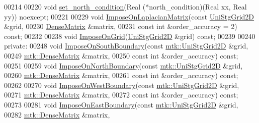 \begin{DoxyCode}
00214 
00220   \textcolor{keywordtype}{void} \hyperlink{classmtk_1_1BCDescriptor2D_a690f6881a88b202c074d9f90f2a7ddb0}{set\_north\_condition}(Real (*north\_condition)(Real xx, Real yy)) noexcept;
00221 
00229   \textcolor{keywordtype}{void} \hyperlink{classmtk_1_1BCDescriptor2D_a35592617dda3b965b680b2a1355122f4}{ImposeOnLaplacianMatrix}(\textcolor{keyword}{const} \hyperlink{classmtk_1_1UniStgGrid2D}{UniStgGrid2D} &grid,
00230                                \hyperlink{classmtk_1_1DenseMatrix}{DenseMatrix} &matrix,
00231                                \textcolor{keyword}{const} \textcolor{keywordtype}{int} &order\_accuracy = 2) \textcolor{keyword}{const};
00232 
00238   \textcolor{keywordtype}{void} \hyperlink{classmtk_1_1BCDescriptor2D_a5f0ff1fda1b5266dcd77ba2301c8ba2c}{ImposeOnGrid}(\hyperlink{classmtk_1_1UniStgGrid2D}{UniStgGrid2D} &grid) \textcolor{keyword}{const};
00239 
00240 \textcolor{keyword}{private}:
00248   \textcolor{keywordtype}{void} \hyperlink{classmtk_1_1BCDescriptor2D_acba15639218e80fd93aff482b185201e}{ImposeOnSouthBoundary}(\textcolor{keyword}{const} \hyperlink{classmtk_1_1UniStgGrid2D}{mtk::UniStgGrid2D} &grid,
00249                              \hyperlink{classmtk_1_1DenseMatrix}{mtk::DenseMatrix} &matrix,
00250                              \textcolor{keyword}{const} \textcolor{keywordtype}{int} &order\_accuracy) \textcolor{keyword}{const};
00251 
00259   \textcolor{keywordtype}{void} \hyperlink{classmtk_1_1BCDescriptor2D_a6062894dbe7c6f42a3bbcc54f2f8973d}{ImposeOnNorthBoundary}(\textcolor{keyword}{const} \hyperlink{classmtk_1_1UniStgGrid2D}{mtk::UniStgGrid2D} &grid,
00260                              \hyperlink{classmtk_1_1DenseMatrix}{mtk::DenseMatrix} &matrix,
00261                              \textcolor{keyword}{const} \textcolor{keywordtype}{int} &order\_accuracy) \textcolor{keyword}{const};
00262 
00270   \textcolor{keywordtype}{void} \hyperlink{classmtk_1_1BCDescriptor2D_a0e7bc4d22fa8c9b9a29dd71669b35744}{ImposeOnWestBoundary}(\textcolor{keyword}{const} \hyperlink{classmtk_1_1UniStgGrid2D}{mtk::UniStgGrid2D} &grid,
00271                             \hyperlink{classmtk_1_1DenseMatrix}{mtk::DenseMatrix} &matrix,
00272                             \textcolor{keyword}{const} \textcolor{keywordtype}{int} &order\_accuracy) \textcolor{keyword}{const};
00273 
00281   \textcolor{keywordtype}{void} \hyperlink{classmtk_1_1BCDescriptor2D_a3cf921884f08bf2eb87af6db7cc1ecba}{ImposeOnEastBoundary}(\textcolor{keyword}{const} \hyperlink{classmtk_1_1UniStgGrid2D}{mtk::UniStgGrid2D} &grid,
00282                             \hyperlink{classmtk_1_1DenseMatrix}{mtk::DenseMatrix} &matrix,

\end{DoxyCode}
